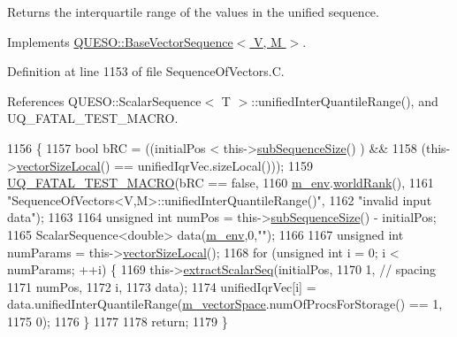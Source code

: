 Returns the interquartile range of the values in the unified sequence. 



Implements \hyperlink{class_q_u_e_s_o_1_1_base_vector_sequence_a49b50dfef9bf3475eb681855268c050d}{Q\-U\-E\-S\-O\-::\-Base\-Vector\-Sequence$<$ V, M $>$}.



Definition at line 1153 of file Sequence\-Of\-Vectors.\-C.



References Q\-U\-E\-S\-O\-::\-Scalar\-Sequence$<$ T $>$\-::unified\-Inter\-Quantile\-Range(), and U\-Q\-\_\-\-F\-A\-T\-A\-L\-\_\-\-T\-E\-S\-T\-\_\-\-M\-A\-C\-R\-O.


\begin{DoxyCode}
1156 \{
1157   \textcolor{keywordtype}{bool} bRC = ((initialPos              <  this->\hyperlink{class_q_u_e_s_o_1_1_sequence_of_vectors_a0224bd3e961d86af5d2886301c0c2b86}{subSequenceSize}()  ) &&
1158               (this->\hyperlink{class_q_u_e_s_o_1_1_base_vector_sequence_a2fefedf9e5b90f22881103b3f92555f6}{vectorSizeLocal}() == unifiedIqrVec.sizeLocal()));
1159   \hyperlink{_defines_8h_a56d63d18d0a6d45757de47fcc06f574d}{UQ\_FATAL\_TEST\_MACRO}(bRC == \textcolor{keyword}{false},
1160                       \hyperlink{class_q_u_e_s_o_1_1_base_vector_sequence_a8e8824d2a63c5a43bcc6473e3a0491e8}{m\_env}.\hyperlink{class_q_u_e_s_o_1_1_base_environment_a78b57112bbd0e6dd0e8afec00b40ffa7}{worldRank}(),
1161                       \textcolor{stringliteral}{"SequenceOfVectors<V,M>::unifiedInterQuantileRange()"},
1162                       \textcolor{stringliteral}{"invalid input data"});
1163 
1164   \textcolor{keywordtype}{unsigned} \textcolor{keywordtype}{int} numPos = this->\hyperlink{class_q_u_e_s_o_1_1_sequence_of_vectors_a0224bd3e961d86af5d2886301c0c2b86}{subSequenceSize}() - initialPos;
1165   ScalarSequence<double> data(\hyperlink{class_q_u_e_s_o_1_1_base_vector_sequence_a8e8824d2a63c5a43bcc6473e3a0491e8}{m\_env},0,\textcolor{stringliteral}{""});
1166 
1167   \textcolor{keywordtype}{unsigned} \textcolor{keywordtype}{int} numParams = this->\hyperlink{class_q_u_e_s_o_1_1_base_vector_sequence_a2fefedf9e5b90f22881103b3f92555f6}{vectorSizeLocal}();
1168   \textcolor{keywordflow}{for} (\textcolor{keywordtype}{unsigned} \textcolor{keywordtype}{int} i = 0; i < numParams; ++i) \{
1169     this->\hyperlink{class_q_u_e_s_o_1_1_sequence_of_vectors_ac977b3b26a6af2ae727671f1246262fd}{extractScalarSeq}(initialPos,
1170                            1, \textcolor{comment}{// spacing}
1171                            numPos,
1172                            i,
1173                            data);
1174     unifiedIqrVec[i] = data.unifiedInterQuantileRange(\hyperlink{class_q_u_e_s_o_1_1_base_vector_sequence_a4bd171e39ed050ff105c808336f35198}{m\_vectorSpace}.numOfProcsForStorage() == 
      1,
1175                                                       0);
1176   \}
1177 
1178   \textcolor{keywordflow}{return};
1179 \}
\end{DoxyCode}
